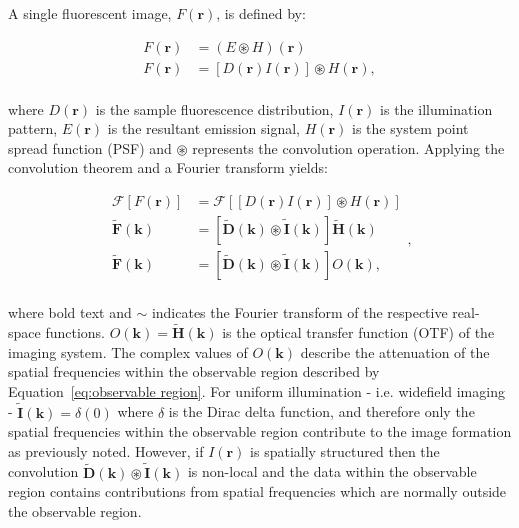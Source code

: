 A single fluorescent image, $F(\textbf{r})$, is defined by:

\begin{equation}\label{eq:fluorescent_image}
\begin{split}
F(\textbf{r}) &= (E \circledast H)(\textbf{r})\\
F(\textbf{r}) &= [D(\textbf{r})I(\textbf{r})] \circledast H(\textbf{r}),\\
\end{split}
\end{equation}

where $D(\textbf{r})$ is the sample fluorescence distribution, 
$I(\textbf{r})$ is the illumination pattern, $E(\textbf{r})$ is the resultant 
emission signal, $H(\textbf{r})$ is the system point spread function (PSF) 
and $\circledast$ represents the convolution operation. Applying the 
convolution theorem and a Fourier transform yields:

\begin{equation}\label{eq:SIM_fluorescent_image_fourier}
\begin{split}
\mathcal{F}\left[F(\textbf{r})\right] &= \mathcal{F}\left[\left[D(\textbf{r})I(\textbf{r})\right] \circledast H(\textbf{r})\right]\\
\tilde{\textbf{F}}(\textbf{k}) &= \left[\tilde{\textbf{D}}(\textbf{k})\circledast \tilde{\textbf{I}}(\textbf{k})\right] \tilde{\textbf{H}}(\textbf{k})\\
\tilde{\textbf{F}}(\textbf{k}) &= \left[\tilde{\textbf{D}}(\textbf{k})\circledast \tilde{\textbf{I}}(\textbf{k})\right] O(\textbf{k}),\\
\end{split},
\end{equation}

where bold text and $\sim$ indicates the Fourier transform of the respective real-space
functions. $O(\textbf{k}) = \tilde{\textbf{H}}(\textbf{k})$ is the optical transfer
function (OTF) of the imaging system. The complex values of $O(\textbf{k})$
describe the attenuation of the spatial frequencies within the observable 
region described by Equation~\ref{eq:observable region}. For uniform 
illumination - i.e. widefield imaging - $\tilde{\textbf{I}}(\textbf{k}) = \delta(0)$ 
where $\delta$ is the Dirac delta function, and therefore only the spatial 
frequencies within the observable region contribute to the image formation as 
previously noted.  However, if $I(\textbf{r})$ is spatially structured then 
the convolution $\tilde{\textbf{D}}(\textbf{k})\circledast \tilde{\textbf{I}}(\textbf{k})$ is 
non-local and the  data within the observable region contains contributions 
from spatial frequencies which are normally outside the observable region.

